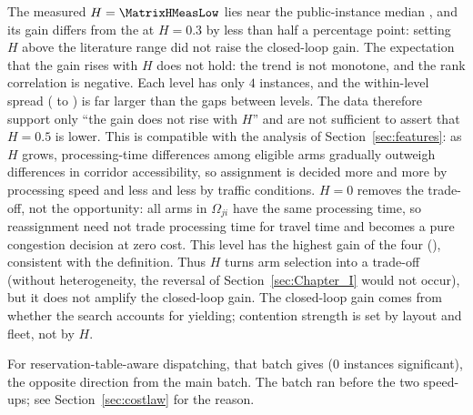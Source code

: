 The measured $H=\MatrixHMeasLow$ lies near the public-instance median \PubHMed{}, and its gain \GainIntegHLow{} differs from the \GainIntegHMid{} at $H=0.3$ by less than half a percentage point: setting $H$ above the literature range did not raise the closed-loop gain.
The expectation that the gain rises with $H$ does not hold: the trend is not monotone, and the rank correlation is negative. Each level has only $4$ instances, and the within-level spread (\GainIntegMatrixLo{} to \GainIntegMatrixHi{}) is far larger than the gaps between levels. The data therefore support only ``the gain does not rise with $H$'' and are not sufficient to assert that $H=0.5$ is lower.
This is compatible with the analysis of Section~\ref{sec:features}: as $H$ grows, processing-time differences among eligible arms gradually outweigh differences in corridor accessibility, so assignment is decided more and more by processing speed and less and less by traffic conditions.
$H=0$ removes the trade-off, not the opportunity: all arms in $\Omega_{ji}$ have the same processing time, so reassignment need not trade processing time for travel time and becomes a pure congestion decision at zero cost. This level has the highest gain of the four (\GainIntegHZero{}), consistent with the definition.
Thus $H$ turns arm selection into a trade-off (without heterogeneity, the reversal of Section~\ref{sec:Chapter_I} would not occur), but it does not amplify the closed-loop gain. The closed-loop gain comes from whether the search accounts for yielding; contention strength is set by layout and fleet, not by $H$.

For reservation-table-aware dispatching, that batch gives \GainProbePre{} ($0$ instances significant), the opposite direction from the main batch. The batch ran before the two speed-ups; see Section~\ref{sec:costlaw} for the reason.

